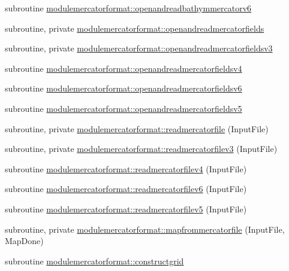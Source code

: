 \begin{DoxyCompactItemize}
\item 
subroutine \mbox{\hyperlink{namespacemodulemercatorformat_a19c4e862a6301eb0e3e8c373ab8a15f9}{modulemercatorformat\+::openandreadbathymmercatorv6}}
\item 
subroutine, private \mbox{\hyperlink{namespacemodulemercatorformat_a2c5e1b6294e73cf15d0617776b56408c}{modulemercatorformat\+::openandreadmercatorfields}}
\item 
subroutine, private \mbox{\hyperlink{namespacemodulemercatorformat_a37b4ad910fc8c1eca130c7b29a79d828}{modulemercatorformat\+::openandreadmercatorfieldsv3}}
\item 
subroutine \mbox{\hyperlink{namespacemodulemercatorformat_af19270e1386bf4e1df36be8a213e6370}{modulemercatorformat\+::openandreadmercatorfieldsv4}}
\item 
subroutine \mbox{\hyperlink{namespacemodulemercatorformat_a4cccec2de301fe19e324230b88faa275}{modulemercatorformat\+::openandreadmercatorfieldsv6}}
\item 
subroutine \mbox{\hyperlink{namespacemodulemercatorformat_afe37149b201bad497334d96a671ed27c}{modulemercatorformat\+::openandreadmercatorfieldsv5}}
\item 
subroutine, private \mbox{\hyperlink{namespacemodulemercatorformat_a2f894929004ec4d27c855864f3122541}{modulemercatorformat\+::readmercatorfile}} (Input\+File)
\item 
subroutine, private \mbox{\hyperlink{namespacemodulemercatorformat_a4f174ab179c1ebc3bd16e672df98d3e2}{modulemercatorformat\+::readmercatorfilev3}} (Input\+File)
\item 
subroutine \mbox{\hyperlink{namespacemodulemercatorformat_a5bdb4983fc890f8f3c9d524bd6516d2c}{modulemercatorformat\+::readmercatorfilev4}} (Input\+File)
\item 
subroutine \mbox{\hyperlink{namespacemodulemercatorformat_a581fc371026e728b42cbf50f824fc39f}{modulemercatorformat\+::readmercatorfilev6}} (Input\+File)
\item 
subroutine \mbox{\hyperlink{namespacemodulemercatorformat_a66a44152e01a257880168d77ee61a18d}{modulemercatorformat\+::readmercatorfilev5}} (Input\+File)
\item 
subroutine, private \mbox{\hyperlink{namespacemodulemercatorformat_a99c34f27fc6fb0d01e289f47e4e8a27b}{modulemercatorformat\+::mapfrommercatorfile}} (Input\+File, Map\+Done)
\item 
subroutine \mbox{\hyperlink{namespacemodulemercatorformat_abe7eddb3220bab2097cf2622ced34f57}{modulemercatorformat\+::constructgrid}}
\item 

\end{DoxyCompactItemize}
